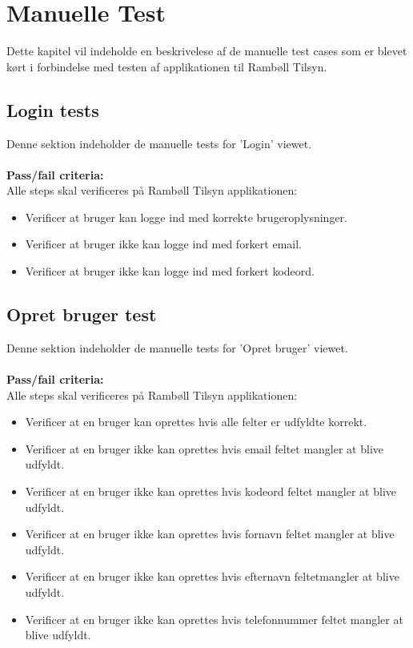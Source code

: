 \chapter{Manuelle Test}
Dette kapitel vil indeholde en beskrivelese af de manuelle test cases som er blevet kørt i forbindelse med testen af applikationen til Rambøll Tilsyn.

\section{Login tests}
Denne sektion indeholder de manuelle tests for 'Login' viewet. \\ \\
\textbf{Pass/fail criteria:} \\
Alle steps skal verificeres på Rambøll Tilsyn applikationen:
\begin{itemize}[-]
	\item Verificer at bruger kan logge ind med korrekte brugeroplysninger.
	\item Verificer at bruger ikke kan logge ind med forkert email.
	\item Verificer at bruger ikke kan logge ind med forkert kodeord. \\
\end{itemize}

\section{Opret bruger test}
Denne sektion indeholder de manuelle tests for 'Opret bruger' viewet. \\ \\
\textbf{Pass/fail criteria:} \\
Alle steps skal verificeres på Rambøll Tilsyn applikationen:
\begin{itemize}[-]
	\item Verificer at en bruger kan oprettes hvis alle felter er udfyldte korrekt.
	\item Verificer at en bruger ikke kan oprettes hvis email feltet mangler at blive udfyldt.
	\item Verificer at en bruger ikke kan oprettes hvis kodeord feltet mangler at blive udfyldt.
	\item Verificer at en bruger ikke kan oprettes hvis fornavn feltet mangler at blive udfyldt.
	\item Verificer at en bruger ikke kan oprettes hvis efternavn feltetmangler at blive udfyldt.
	\item Verificer at en bruger ikke kan oprettes hvis telefonnummer feltet mangler at blive udfyldt. \\
\end{itemize}

